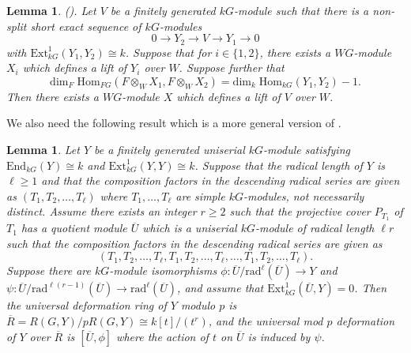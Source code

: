 \documentclass{amsart}
\theoremstyle{plain}
\newtheorem{lemma}[thm]{Lemma}
\theoremstyle{definition}
\theoremstyle{remark}
\begin{document}
\begin{lemma}
\label{lem:Wlift}
{\rm (\cite[Lemma 2.3.2]{3sim}).}
Let $V$ be a finitely generated $kG$-module such that there is a non-split short exact sequence of 
$kG$-modules
$$0\to Y_2\to V\to Y_1\to 0$$
with $\mathrm{Ext}^1_{kG}(Y_1,Y_2)\cong k$.
Suppose that for $i\in\{1,2\}$, there exists a $WG$-module $X_i$ which defines a lift of $Y_i$ over $W$. 
Suppose further that 
$$\mathrm{dim}_F\;\mathrm{Hom}_{FG}(F\otimes_WX_1,F\otimes_WX_2) =
\mathrm{dim}_k\;\mathrm{Hom}_{kG}(Y_1,Y_2)-1.$$
Then there exists a $WG$-module $X$ which defines a lift of $V$ over $W$.
\end{lemma}

We also need the following result which is a more general version of \cite[Lemma 2.3.1]{3sim}.

\begin{lemma}
\label{lem:trythis}
Let $Y$ be a finitely generated uniserial $kG$-module 
satisfying $\mathrm{End}_{kG}(Y)\cong k$ 
and $\mathrm{Ext}^1_{kG}(Y,Y)\cong k$. Suppose that the radical length of $Y$ is $\ell\ge 1$
and that the composition factors in the descending radical series are given as 
$(T_1,T_2,\ldots, T_\ell)$ where $T_1,\ldots,T_\ell$ are simple $kG$-modules, not necessarily distinct.
Assume there exists an integer $r\ge 2$ such that the projective cover $P_{T_1}$ of $T_1$
has a quotient module $\overline{U}$ which is a uniserial $kG$-module of radical length
$\ell r$ such that the composition factors in the descending radical series are given as
$$(T_1,T_2,\ldots,T_\ell,T_1,T_2,\ldots,T_\ell,\ldots,T_1,T_2,\ldots,T_\ell).$$
Suppose there are $kG$-module isomorphisms  
$\phi: \overline{U} /\mathrm{rad}^{\ell} (\overline{U})\to  Y$ and 
$\psi:\overline{U} /\mathrm{rad}^{\ell (r-1)} (\overline{U})\to
\mathrm{rad}^{\ell}(\overline{U})$, and assume that
$\mathrm{Ext}^1_{kG}(\overline{U},Y)=0$. Then 
the universal deformation ring of $Y$ 
modulo $p$ is $\overline{R}=R(G,Y)/pR(G,Y)\cong k[t]/(t^{r})$, and the universal mod $p$ deformation 
of $Y$ over $\overline{R}$ is 
$[\overline{U},\phi]$
where the action of $t$ on $\overline{U}$ is induced by $\psi$.
\end{lemma}
\end{document}
